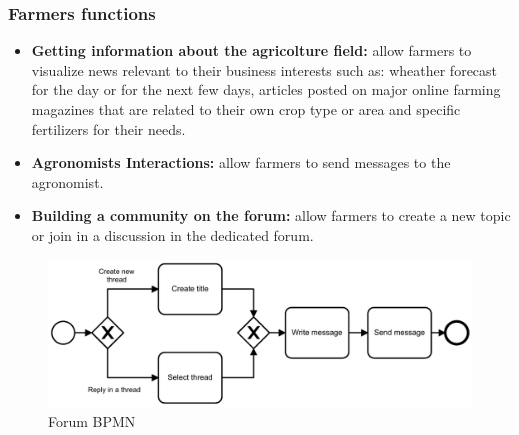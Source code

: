 \documentclass[table, 12pt]{article}
\begin{document}
\subsubsection{Farmers functions}
\begin{itemize}
    \item \textbf{Getting information about the agricolture field:} allow farmers to visualize news relevant to their business interests such as: wheather forecast for the day or for the next few days, articles posted on major online farming magazines that are related to their own crop type or area and specific fertilizers for their needs.
    \item \textbf{Agronomists Interactions:} allow farmers to send messages to the agronomist.
    \item \textbf{Building a community on the forum:} allow farmers to create a new topic or join in a discussion in the dedicated forum.
\end{itemize}
\begin{center}
    \begin{figure}[H]
        \includegraphics[width=\textwidth]{assets/BPMN/ForumBpmn}
        \caption{Forum BPMN}
        \label{fig: forum}
    \end{figure}
\end{center}
\end{document}

